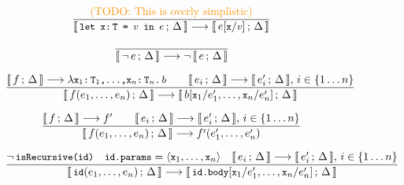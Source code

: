 
\begin{figure}[htb]\ContinuedFloat
\centering
\begin{framed}

\begin{equation}
\dfrac{
  \text{\TODO{This is overly simplistic}}
}{
  \lb{\stt{let x:\,T = $v$ in $e$}}{\Delta} \longrightarrow
  \lb{e[\stt{x}/\stt{$v$}]}{\Delta}
}
\end{equation}



\begin{equation}
\dfrac{
  \empty
}{
  \lb{\neg\, e}{\Delta} \longrightarrow \neg\,\lb{e}{\Delta}
}
\end{equation}

\begin{equation}
\dfrac{
  \llbracket\, f\,;\, \Delta\, \rrbracket \longrightarrow \lambda \texttt{\small{x$_1$:\,T$_1$,\ldots,x$_n$:\,T$_n$.\,$b$}}
  \qquad
  \llbracket\, e_i\,;\, \Delta\, \rrbracket \longrightarrow \llbracket\, e_i'\,;\, \Delta\, \rrbracket,\, i \in \{1 \ldots n\}
}{
  \llbracket\, f(e_1,\ldots,e_n)\,;\, \Delta\, \rrbracket \longrightarrow
  \llbracket\, b[\texttt{\small{x}}_1/e_1',\ldots,\texttt{\small{x}}_n/e_n']\,;\, \Delta\, \rrbracket
}
\end{equation}

\begin{equation}
\dfrac{
  \llbracket\, f\,;\, \Delta\, \rrbracket \longrightarrow f' \qquad
  \llbracket\, e_i\,;\, \Delta\, \rrbracket \longrightarrow \llbracket\, e_i'\,;\, \Delta\, \rrbracket,\, i \in \{1 \ldots n\}
}{
  \llbracket\, f(e_1,\ldots,e_n)\,;\, \Delta\, \rrbracket \longrightarrow
  f'(e_1', \ldots, e_n')
}
\end{equation}


\begin{equation}
\dfrac{
 \neg\,\texttt{\small{isRecursive(id)}} \quad
 \texttt{\small{id.params}} = \langle \texttt{\small{x}}_1, \ldots, \texttt{\small{x}}_n \rangle \quad
 \llbracket\, e_i\,;\, \Delta\, \rrbracket \longrightarrow \llbracket\, e_i'\,;\, \Delta\, \rrbracket,\, i \in \{1 \ldots n\}
}{
  \llbracket\, \texttt{\small{id}}(e_1,\ldots,e_n)\,;\, \Delta\, \rrbracket \longrightarrow
  \llbracket\, \texttt{\small{id.body}}[\texttt{\small{x}}_1/e_1',\ldots,\texttt{\small{x}}_n/e_n']\,;\, \Delta\, \rrbracket
}
\label{fig:symbolicsem:fi1}
\end{equation}


\end{framed}
\end{figure}
